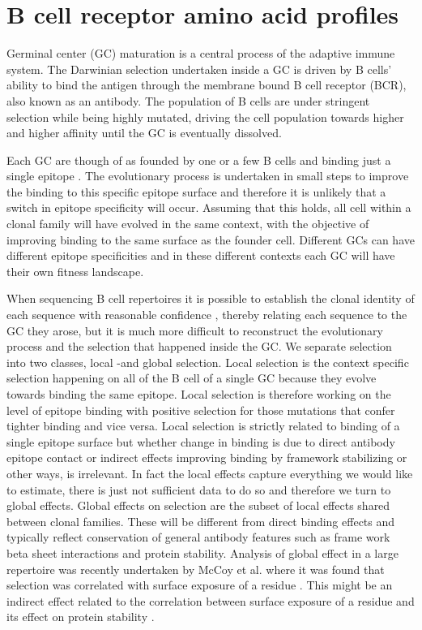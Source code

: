 
\iffalse




\chapter{B cell receptor amino acid profiles}

Germinal center (GC) maturation is a central process of the adaptive immune system.
The Darwinian selection undertaken inside a GC is driven by B cells' ability to bind the antigen through the membrane bound B cell receptor (BCR), also known as an antibody.
The population of B cells are under stringent selection while being highly mutated, driving the cell population towards higher and higher affinity until the GC is eventually dissolved.

Each GC are though of as founded by one or a few B cells and binding just a single epitope \cite{tas2016visualizing}.
The evolutionary process is undertaken in small steps to improve the binding to this specific epitope surface and therefore it is unlikely that a switch in epitope specificity will occur.
Assuming that this holds, all cell within a clonal family will have evolved in the same context, with the objective of improving binding to the same surface as the founder cell.
Different GCs can have different epitope specificities and in these different contexts each GC will have their own fitness landscape.

When sequencing B cell repertoires it is possible to establish the clonal identity of each sequence with reasonable confidence \cite{ralph2016likelihood}, thereby relating each sequence to the GC they arose, but it is much more difficult to reconstruct the evolutionary process and the selection that happened inside the GC.
We separate selection into two classes, local -and global selection.
Local selection is the context specific selection happening on all of the B cell of a single GC because they evolve towards binding the same epitope.
Local selection is therefore working on the level of epitope binding with positive selection for those mutations that confer tighter binding and vice versa.
Local selection is strictly related to binding of a single epitope surface but whether change in binding is due to direct antibody epitope contact or indirect effects improving binding by framework stabilizing or other ways, is irrelevant.
In fact the local effects capture everything we would like to estimate, there is just not sufficient data to do so and therefore we turn to global effects.
Global effects on selection are the subset of local effects shared between clonal families.
These will be different from direct binding effects and typically reflect conservation of general antibody features such as frame work beta sheet interactions and protein stability.
Analysis of global effect in a large repertoire was recently undertaken by McCoy et al. where it was found that selection was correlated with surface exposure of a residue \cite{mccoy2015quantifying}.
This might be an indirect effect related to the correlation between surface exposure of a residue and its effect on protein stability \cite{echave2016causes}.

